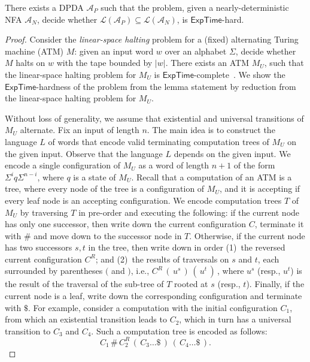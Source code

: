 \documentclass{CSML}
\newcommand{\aut}{\mathcal{A}}
\newcommand{\EXPTIME}{\textsf{ExpTime}}
\newcommand{\lang}{\mathcal{L}}
\begin{document}
\begin{lem}
There exists a DPDA $\aut_P$ such that the problem, given a nearly-deterministic NFA $\aut_N$, decide
whether $\lang({\aut_P}) \subseteq \lang(\aut_N)$, is $\EXPTIME$-hard.
\label{l:ExpTimeHardness}
\end{lem}


\begin{proof}
\newcommand{\Ap}{\mathcal{A}_P}
\newcommand{\Ar}{\mathcal{A}_N}
\newcommand{\UATM}{{M}_U}
Consider the \emph{linear-space halting} problem for a (fixed) alternating Turing machine (ATM) $M$:
given an input word $w$ over an alphabet $\Sigma$, decide whether $M$ halts on $w$ with the tape bounded by $|w|$.
There exists an ATM $\UATM$, such that
the linear-space halting problem for $\UATM$ is $\EXPTIME$-complete~\cite{Chandra:1981:ALT:322234.322243}.
We show the $\EXPTIME$-hardness of the problem from the lemma statement by reduction from the 
linear-space halting problem for $\UATM$.

Without loss of generality, we assume that existential and universal transitions of $\UATM$ alternate. Fix an input of length $n$.
The main idea is to construct the language $L$ of words that encode valid terminating computation trees of $\UATM$ on the given input. 
Observe that the language $L$ depends on the given input. 
We encode a single configuration of $\UATM$ as a word of length $n+1$ of the form $\Sigma^i q \Sigma^{n-i}$, where $q$ is a state of $\UATM$. 
Recall that a computation of an ATM is a tree, where every node of the tree is a configuration of $\UATM$,  
and it is accepting if every leaf node is an accepting configuration.
We encode computation trees $T$  of $\UATM$ by traversing $T$ in pre-order and executing the following:
if the current node has only one successor, then write down the current configuration $C$, terminate it with $\#$ 
and move down to the successor node in $T$.
Otherwise, if the current node has two successors $s,t$ in the tree, then write 
down in order (1)~the reversed current configuration $C^R$; and (2)~the results of traversals on $s$ and $t$, each surrounded  by parentheses $($ and $)$, i.e.,
$C^R\, (\, u^{s}\,)\,(\,u^{t}\,)\,$, where $u^{s}$ (resp., $u^{t}$) is the result of the traversal of the sub-tree of $T$ rooted at $s$ (resp., $t$).
Finally, if the current node is a leaf, write down the corresponding configuration and terminate with $\$$.
For example, consider a computation with the initial configuration $C_1$, from which an existential transition 
leads to $C_2$, which in turn has a universal transition to $C_3$ and $C_4$. Such a computation tree
 is encoded as follows:
\[
C_1\, \#\, C_2^R\, \left(\, C_{3} \ldots \$\,\right)\, \left(\, C_{4} \ldots \$\,\right). 
\]


\end{proof}
\end{document}
